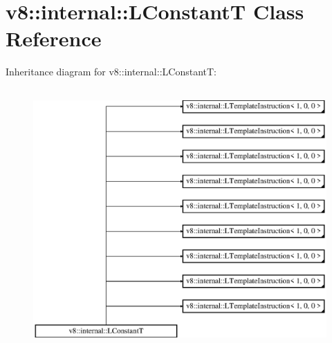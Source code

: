 \hypertarget{classv8_1_1internal_1_1_l_constant_t}{}\section{v8\+:\+:internal\+:\+:L\+ConstantT Class Reference}
\label{classv8_1_1internal_1_1_l_constant_t}
Inheritance diagram for v8\+:\+:internal\+:\+:L\+ConstantT\+:\begin{figure}[H]
\begin{center}
\leavevmode
\includegraphics[height=10.000000cm]{classv8_1_1internal_1_1_l_constant_t}
\end{center}
\end{figure}
